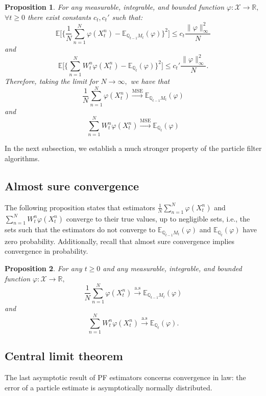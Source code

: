 \documentclass[
]{book}
\theoremstyle{break}
\newtheorem{proposition}{Proposition}
\theoremstyle{nonumberplain}
\begin{document}
\begin{proposition}
For any measurable, integrable, and bounded function $\varphi:\mathcal X\rightarrow\mathbb R,$ $\forall t\geq0$ there exist constants $c_t,c_t'$ such that:
$$
\mathbb E\Bigg[ \bigg\{ \frac{1}{N} \sum\limits_{n=1}^N \varphi(X_t^n)-\mathbb E_{\mathbb Q_{t-1}M_t}(\varphi)\bigg\}^2 \Bigg]\leq c_t \frac{\|\varphi\|_{\infty}^2}{N}
$$
and 
$$
    \mathbb E\Bigg[ \bigg\{\sum\limits_{n=1}^N W_t^n \varphi(X_t^n)-\mathbb E_{\mathbb Q_t}(\varphi) \bigg\}^2 \Bigg]\leq c_t' \frac{\|\varphi\|_{\infty}^2}{N}.
$$
Therefore, taking the limit for $N\rightarrow \infty,$ we have that 
$$
\frac{1}{N} \sum\limits_{n=1}^N \varphi(X_t^n)\xrightarrow{\text{MSE}}\mathbb E_{\mathbb Q_{t-1}M_t}(\varphi)
$$
and 
$$
\sum\limits_{n=1}^N W_t^n \varphi(X_t^n)\xrightarrow{\text{MSE}}\mathbb E_{\mathbb Q_t}(\varphi)
$$
\end{proposition}

In the next subsection, we establish a much stronger property of the
particle filter algorithms.

\subsection{Almost sure convergence}

The following proposition states that estimators
\(\frac{1}{N} \sum\limits_{n=1}^N \varphi(X_t^n)\) and
\(\sum\limits_{n=1}^N W_t^n \varphi(X_t^n)\) converge to their true
values, up to negligible sets, i.e., the sets such that the estimators
do not converge to \(\mathbb E_{\mathbb Q_{t-1}M_t}(\varphi)\) and
\(\mathbb E_{\mathbb Q_t}(\varphi)\) have zero probability.
Additionally, recall that almost sure convergence implies convergence in
probability. \bigskip

\begin{proposition}
For any $t\geq0$ and any measurable, integrable, and bounded function $\varphi:\mathcal X\rightarrow\mathbb R,$
$$
\frac{1}{N} \sum\limits_{n=1}^N \varphi(X_t^n)\xrightarrow{\text{a.s}}\mathbb E_{\mathbb Q_{t-1}M_t}(\varphi)
$$
and 
$$
\sum\limits_{n=1}^N W_t^n \varphi(X_t^n)\xrightarrow{\text{a.s}}\mathbb E_{\mathbb Q_{t}}(\varphi).
$$
\end{proposition}

\subsection{Central limit theorem}

The last asymptotic result of PF estimators concerns convergence in law:
the error of a particle estimate is asymptotically normally distributed.
\bigskip
\end{document}
